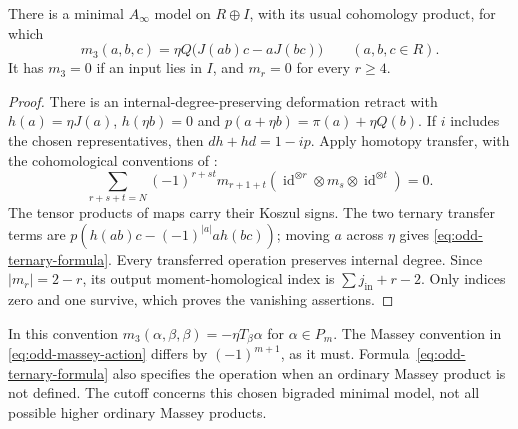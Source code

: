\begin{proposition}
\label{prop:odd-ternary-model}
There is a minimal $A_\infty$ model on $R\oplus I$, with its usual
cohomology product, for which
\begin{equation}\label{eq:odd-ternary-formula}
 m_3(a,b,c)=\eta Q\bigl(J(ab)c-aJ(bc)\bigr)
                                   \qquad(a,b,c\in R).
\end{equation}
It has $m_3=0$ if an input lies in $I$, and $m_r=0$ for every $r\ge4$.
\end{proposition}
\begin{proof}
There is an internal-degree-preserving deformation retract with
$h(a)=\eta J(a)$, $h(\eta b)=0$ and
$p(a+\eta b)=\pi(a)+\eta Q(b)$.
If $i$ includes the chosen representatives, then $dh+hd=1-ip$.
Apply homotopy transfer, with the cohomological conventions of
\cite[Section~3]{KellerAInfinity}:
\[
 \sum_{r+s+t=N}(-1)^{r+st}
 m_{r+1+t}
   (\operatorname{id}^{\otimes r}\otimes m_s
                  \otimes\operatorname{id}^{\otimes t})=0.
\]
The tensor products of maps carry their Koszul signs.
The two ternary transfer terms are
$p(h(ab)c-(-1)^{|a|}a h(bc))$; moving $a$ across $\eta$ gives
\eqref{eq:odd-ternary-formula}.
Every transferred operation preserves internal degree. Since
$|m_r|=2-r$, its output moment-homological index is
$\sum j_{\mathrm{in}}+r-2$. Only indices zero and one survive,
which proves the vanishing assertions.
\end{proof}

In this convention
$m_3(\alpha,\beta,\beta)=-\eta T_\beta\alpha$ for $\alpha\in P_m$.
The Massey convention in \eqref{eq:odd-massey-action} differs by
$(-1)^{m+1}$, as it must. Formula~\eqref{eq:odd-ternary-formula}
also specifies the operation when an ordinary Massey product is
not defined. The cutoff concerns this chosen bigraded minimal
model, not all possible higher ordinary Massey products.

